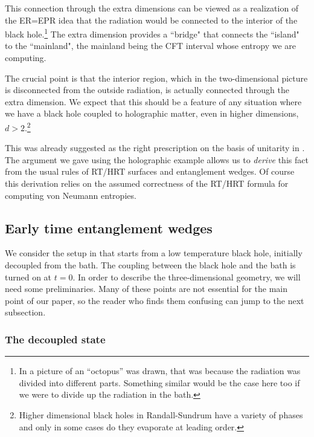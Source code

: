 \documentclass[12pt]{article}
\def\la{\label}
\begin{document}
This connection through the extra dimensions can be viewed as a realization of the ER=EPR idea that the radiation would be connected to the interior of the black hole.\footnote{In \cite{Maldacena:2013xja} a picture of an ``octopus'' was drawn, that was because the radiation was divided into different parts. Something similar would be the case here too if we were to divide up the radiation in the bath.} 
The extra dimension provides a ``bridge" that connects the ``island" to the ``mainland", the mainland being the CFT interval whose entropy we are computing.
  
The crucial point is that the interior region, which in the two-dimensional picture is disconnected from the outside radiation,  is actually connected through the extra dimension. We expect that this should be a feature of any situation where we have a black hole coupled to holographic matter, even in higher dimensions, $d>2$.\footnote{Higher dimensional black holes in Randall-Sundrum have a variety of phases \cite{Hubeny:2009ru,Figueras:2011gd,Santos:2012he,Santos:2014yja} and only in some cases do they evaporate at leading order.}

This was already suggested as the right prescription on the basis of unitarity in \cite{Hayden:2018khn,Penington:2019npb}. The argument we gave using the holographic example allows us to {\it derive} this fact from the usual rules of RT/HRT surfaces and entanglement wedges. Of course this derivation relies on the assumed correctness of the RT/HRT formula for computing von Neumann entropies. 

\subsection{Early time entanglement wedges}
 
We consider the setup in \cite{Almheiri:2019psf} that starts from a low temperature black hole, initially decoupled from the bath. 
The coupling between the black hole and the bath is turned on at $t=0$.
In order to describe the three-dimensional geometry, we will need some preliminaries.
Many of these points are not essential for the main point of our paper, so the reader who finds them confusing can jump to the next subsection.
   
\subsubsection{The decoupled state}
\la{CFTwB} 
   
\end{document}
